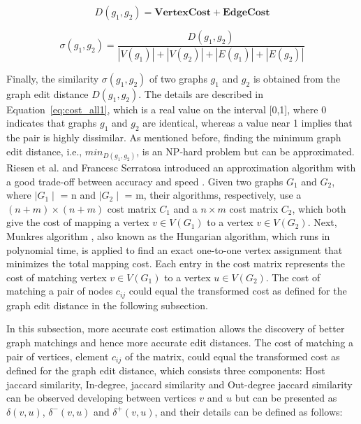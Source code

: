 \begin{equation}
        \label{eq:ged}
        D(g_{1}, g_{2}) = \mathbf{VertexCost} + \mathbf{EdgeCost}
\end{equation}

\begin{equation}
        \label{eq:cost_all1}
\sigma (g_{1},g_{2}) = \frac{D(g_{1}, g_{2})}{\left | V(g_{1}) \right | + \left | V(g_{2}) \right | +\left | E(g_{1}) \right | + \left | E(g_{2}) \right |}
\end{equation}

Finally, the similarity $\sigma (g_{1},g_{2}) $ of two graphs $g_{1}$ and $g_{2}$ is obtained from the graph edit distance $D(g_{1}, g_{2})$. The details are described in Equation~\ref{eq:cost_all1}, which is a real value on the interval [0,1], where 0 indicates that graphs $g_{1}$ and $g_{2}$ are identical, whereas a value near 1 implies that the pair is highly dissimilar. As mentioned before, finding the minimum graph edit distance, i.e., $min_{D(g_{1}, g_{2})}$, is an NP-hard problem but can be approximated. Riesen et al. and  Francesc Serratosa introduced an approximation algorithm with a good trade-off between accuracy and speed \cite{p:Riesen09} \cite{p:Serratosa14}. Given two graphs $G_{1}$ and $G_{2}$, where $\mid G_{1}\mid$ = n and $\mid G_{2}\mid$ = m, their algorithms, respectively, use a $(n+m) \times (n+m)$ cost matrix $C_{1}$ and a $n \times m$ cost matrix $C_{2}$, which both give the cost of mapping a vertex $v \in V(G_{1})$ to a vertex $v \in V(G_{2})$. Next,  Munkres algorithm \cite{p:Munkres57}, also known as the Hungarian algorithm, which runs in polynomial time, is applied to find an exact one-to-one vertex assignment  that minimizes the total mapping cost. Each entry in the cost matrix represents the cost of matching vertex $v \in V(G_{1})$ to a vertex $u \in V(G_{2})$. The cost of matching a pair of nodes $c_{ij}$ could equal the transformed cost as defined for the graph edit distance in the following subsection.

In this subsection, more accurate cost estimation allows the discovery of better graph matchings and hence more accurate edit distances.  The cost of matching a pair of vertices, element $c_{ij}$ of the matrix, could equal the transformed cost as defined for the graph edit distance, which consists three components:  Host jaccard similarity, In-degree,  jaccard similarity and  Out-degree jaccard similarity can be observed developing between vertices $v$ and $u$ but can be presented as $\delta \left ( v, u \right )$, $\delta^{-} \left ( v, u \right )$ and $\delta^{+} \left ( v, u \right )$, and their details can be defined as follows: 

